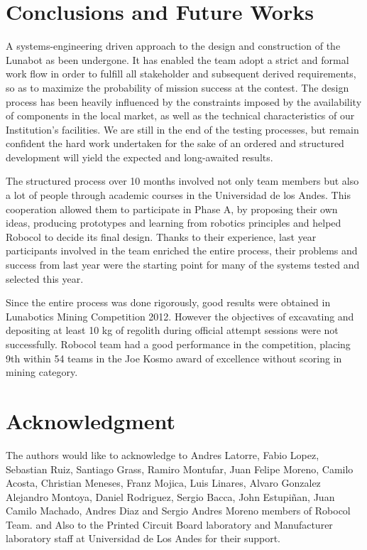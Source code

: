 \documentclass[conference]{IEEEtran}
\begin{document}
\section{Conclusions and Future Works} %
A systems-engineering driven approach to the design and construction of the Lunabot as been undergone. It has enabled the team adopt a strict and formal work flow in order to fulfill all stakeholder and subsequent derived requirements, so as to maximize the probability of mission success at the contest. The design process has been heavily influenced by the constraints imposed by the availability of components in the local market, as well as the technical characteristics of our Institution's facilities. We are still in the end of the testing processes, but remain confident the hard work undertaken for the sake of an ordered and structured development will yield the expected and long-awaited results.

The structured process over  10 months involved not only team members but also a lot of people through academic courses in the Universidad de los Andes. This cooperation allowed them to participate in Phase A, by proposing their own ideas, producing prototypes and learning from robotics principles and helped Robocol to decide its final design. Thanks to their experience, last year participants involved in the team enriched the entire process, their problems and success from last year were the starting point for many of the systems tested and selected this year. 

Since the entire process was done rigorously, good results were obtained in  Lunabotics Mining Competition 2012. However the objectives of excavating and depositing at least 10 kg of regolith during official attempt sessions were not successfully.  Robocol team had a good performance in the competition, placing 9th within 54 teams in the Joe Kosmo award of excellence without scoring in mining category.

\section*{Acknowledgment} 
The authors would like to acknowledge to Andres Latorre,  Fabio Lopez, Sebastian Ruiz, Santiago Grass,
Ramiro Montufar, Juan Felipe Moreno, Camilo Acosta, Christian Meneses, Franz Mojica, Luis Linares, Alvaro Gonzalez
Alejandro Montoya, Daniel Rodriguez, Sergio Bacca, John Estupiñan, Juan Camilo Machado, Andres Diaz  and Sergio Andres Moreno members of Robocol Team. and Also  to  the Printed Circuit Board laboratory and  Manufacturer laboratory staff  at Universidad de Los Andes for their support. 




\end{document}
